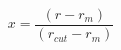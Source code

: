 \documentclass[12pt]{article}
\begin{document}
$$
   x = \frac{(r-r_m)}{(r_{cut}-r_m)}
$$
\end{document}
